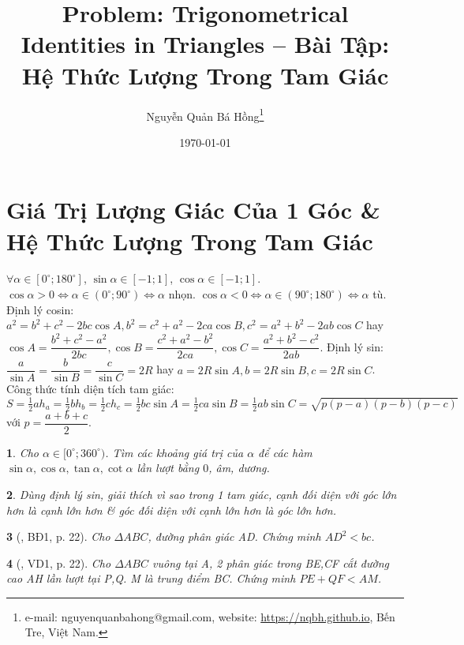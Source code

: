 \documentclass{article}
\title{Problem: Trigonometrical Identities in Triangles -- Bài Tập: Hệ Thức Lượng Trong Tam Giác}
\author{Nguyễn Quản Bá Hồng\footnote{e-mail: {\sf nguyenquanbahong@gmail.com}, website: \url{https://nqbh.github.io}, Bến Tre, Việt Nam.}}
\date{\today}
\newtheorem{baitoan}{}
\begin{document}
\maketitle
\tableofcontents


\section{Giá Trị Lượng Giác Của 1 Góc \& Hệ Thức Lượng Trong Tam Giác}
 $\forall\alpha\in[0^\circ;180^\circ]$, $\sin\alpha\in[-1;1]$, $\cos\alpha\in[-1;1]$.  $\cos\alpha > 0\Leftrightarrow\alpha\in(0^\circ;90^\circ)\Leftrightarrow\alpha$ nhọn. $\cos\alpha < 0\Leftrightarrow\alpha\in(90^\circ;180^\circ)\Leftrightarrow\alpha$ tù.  Định lý cosin: $a^2 = b^2 + c^2 - 2bc\cos A,b^2 = c^2 + a^2 - 2ca\cos B,c^2 = a^2 + b^2 - 2ab\cos C$ hay $\cos A = \dfrac{b^2 + c^2 - a^2}{2bc},\cos B = \dfrac{c^2 + a^2 - b^2}{2ca},\cos C = \dfrac{a^2 + b^2 - c^2}{2ab}$.  Định lý sin: $\dfrac{a}{\sin A} = \dfrac{b}{\sin B} = \dfrac{c}{\sin C} = 2R$ hay $a = 2R\sin A,b = 2R\sin B,c = 2R\sin C$.  Công thức tính diện tích tam giác: $S = \frac{1}{2}ah_a = \frac{1}{2}bh_b = \frac{1}{2}ch_c = \frac{1}{2}bc\sin A = \frac{1}{2}ca\sin B = \frac{1}{2}ab\sin C = \sqrt{p(p - a)(p - b)(p - c)}$ với $p = \dfrac{a + b + c}{2}$.

\begin{baitoan}
	Cho $\alpha\in[0^\circ;360^\circ)$. Tìm các khoảng giá trị của $\alpha$ để các hàm $\sin\alpha,\cos\alpha,\tan\alpha,\cot\alpha$ lần lượt bằng $0$, âm, dương.
\end{baitoan}

\begin{baitoan}
	Dùng định lý sin, giải thích vì sao trong 1 tam giác, cạnh đối diện với góc lớn hơn là cạnh lớn hơn \& góc đối diện với cạnh lớn hơn là góc lớn hơn.
\end{baitoan}

\begin{baitoan}[\cite{Hai_Hung_Thu_Tung2022_tap_1}, BĐ1, p. 22]
	Cho $\Delta ABC$, đường phân giác AD. Chứng minh $AD^2 < bc$.
\end{baitoan}

\begin{baitoan}[\cite{Hai_Hung_Thu_Tung2022_tap_1}, VD1, p. 22]
	Cho $\Delta ABC$ vuông tại A, 2 phân giác trong BE,CF cắt đường cao AH lần lượt tại P,Q. M là trung điểm BC. Chứng minh $PE + QF < AM$.
\end{baitoan}
\end{document}
